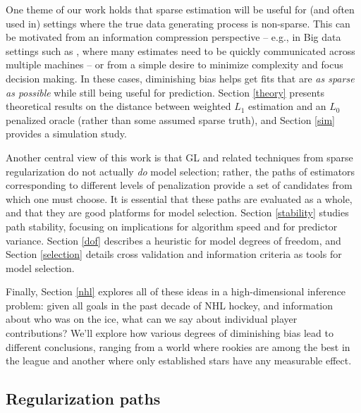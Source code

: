 \documentclass[12pt]{article}
\begin{document}
One theme of our work holds that sparse estimation will be useful for (and
often used in) settings where the true data generating process is non-sparse.
This can be motivated from an information compression  perspective -- e.g., in
Big data settings such as
\cite{taddy_distributed_2013}, where many estimates need to be quickly
communicated across multiple machines -- or from a simple desire to minimize
complexity and focus decision making.   In these cases, diminishing bias 
helps get fits that are {\it as sparse as possible} while still being useful
for prediction. Section \ref{theory} presents theoretical results on the
distance between weighted $L_1$ estimation and an $L_0$ penalized oracle
(rather than  some assumed sparse truth), and Section
\ref{sim} provides a simulation study.

Another central view of this work is that GL and related
techniques from sparse regularization do not actually {\it do} model
selection; rather, the paths of estimators corresponding to different levels
of penalization provide a set of candidates from which one must choose. It is
essential that these paths are evaluated as a whole, and that they are good platforms for model selection. Section
\ref{stability} studies path stability, focusing on implications for
algorithm speed and for predictor
variance.  Section \ref{dof} describes a heuristic for model
degrees of freedom, and Section \ref{selection} details cross validation and
information criteria as tools for model selection.

Finally,  Section \ref{nhl} explores all of these ideas in a high-dimensional inference problem: given all goals in the past decade of NHL hockey, and information about who was on the ice, what can we say about individual player contributions?  We'll explore how various degrees of diminishing bias lead to different conclusions, ranging from a world where rookies are among the best in the league and another where only established stars have any measurable effect.


\subsection{Regularization paths}
\end{document}
